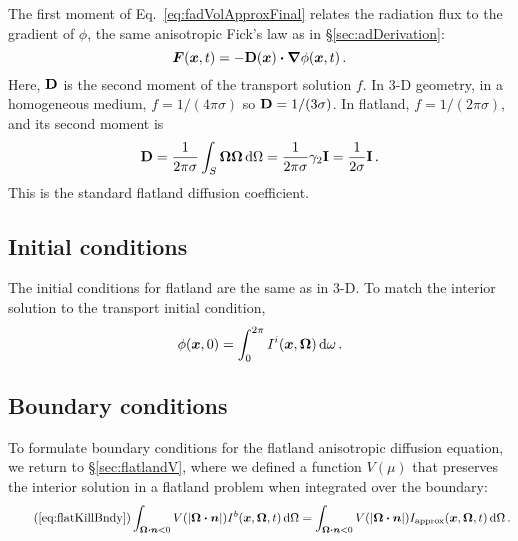 The first moment of Eq.~\eqref{eq:fadVolApproxFinal} relates the radiation flux
to the gradient of $\phi$, the same anisotropic Fick's law as in
\S\ref{sec:adDerivation}:
\begin{equation}\tagref{eq:adFicks}
  \vec{F}(\vec{x},t) = - \Dtens(\vec{x}) \vd \grad \phi(\vec{x},t) \,.
\end{equation}
Here, $\mathbf{D}$ is the second moment of the transport solution $f$. In 3-D
geometry, in a homogeneous medium, $f=1/(4\pi\sigma)$ so $\mathbf{D} = 1/(3\sigma)$.
In flatland, $f = 1/(2\pi\sigma)$, and its second moment is
\begin{equation*}
  \mathbf{D} = \frac{1}{2\pi\sigma} \int_{S}\bm{\Omega}\bm{\Omega}  \mathop{}\!\mathrm{d}\Omega
  = \frac{1}{2\pi\sigma} \gamma_2 \mathbf{I}
  = \frac{1}{2\sigma} \mathbf{I} \,.
\end{equation*}
This is the standard flatland diffusion coefficient.

\subsection{Initial conditions}
The initial conditions for flatland are the same as in 3-D. To match the
interior solution to the transport initial condition,
\begin{equation*}
  \phi(\bm{x},0) = \int_{0}^{2\pi} I^i(\bm{x},\bm{\Omega}) \mathop{}\!\mathrm{d}\omega\,.
\end{equation*}

\subsection{Boundary conditions}

To formulate boundary conditions for the flatland anisotropic diffusion
equation, we return to \S\ref{sec:flatlandV}, where we defined a
function $V(\mu)$ that preserves the interior solution in a flatland problem
when integrated over the boundary:
\begin{equation}\tag{\ref{eq:flatKillBndy}}
\int_{\vec{\Omega}\vd\vec{n} < 0} V( \abs{\vec{\Omega}\vd\vec{n}})
I^b(\vec{x}, \vec{\Omega},t) \ud\Omega
=
\int_{\vec{\Omega}\vd\vec{n} < 0} V( \abs{\vec{\Omega}\vd\vec{n}})
I_\text{approx}(\vec{x}, \vec{\Omega},t) \ud\Omega \,.
\end{equation}

